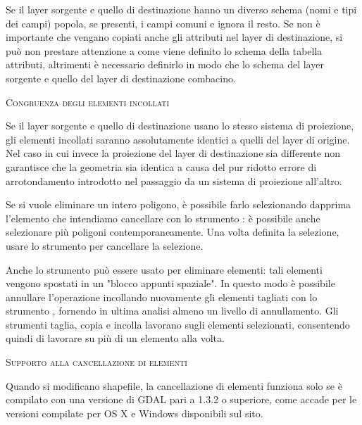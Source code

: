 Se il layer sorgente e quello di destinazione hanno un diverso schema (nomi e
tipi dei campi) \qg popola, se presenti, i campi comuni e ignora il resto.
Se non è importante che vengano copiati anche gli attributi nel layer di
destinazione, si può non prestare attenzione a come viene definito lo schema
della tabella attributi, altrimenti è necessario definirlo in modo che 
lo schema del layer sorgente e quello del layer di destinazione combacino.

\begin{Tip}\caption{\textsc{Congruenza degli elementi incollati}}
Se il layer sorgente e quello di destinazione usano lo stesso sistema
di proiezione, gli elementi incollati saranno assolutamente identici a quelli
del layer di origine. Nel caso in cui invece la proiezione del layer di
destinazione sia differente  \qg non garantisce che la geometria sia identica
a causa del pur ridotto errore di arrotondamento introdotto nel passaggio da
un sistema di proiezione all'altro.
\end{Tip}


Se si vuole eliminare un intero poligono, è possibile farlo selezionando
dapprima l'elemento che intendiamo cancellare con lo strumento
: è possibile anche 
selezionare più poligoni contemporaneamente. Una volta definita la selezione, 
usare lo strumento  
per cancellare la selezione. 

Anche lo strumento  può essere
usato per eliminare elementi: tali elementi vengono spostati in un
"blocco appunti spaziale". In questo modo è possibile annullare
l'operazione incollando nuovamente gli elementi tagliati con lo strumento
, fornendo in ultima
analisi almeno un livello di annullamento.
Gli strumenti taglia, copia e incolla lavorano sugli elementi selezionati, 
consentendo quindi di lavorare su più di un elemento alla volta.

\begin{Tip}\caption{\textsc{Supporto alla cancellazione di elementi}}
Quando si modificano shapefile, la cancellazione di elementi funziona solo se 
\qg è compilato con una versione di GDAL pari a 1.3.2 o
superiore, come accade per le versioni compilate per OS X e Windows
disponibili sul sito.
\end{Tip}

